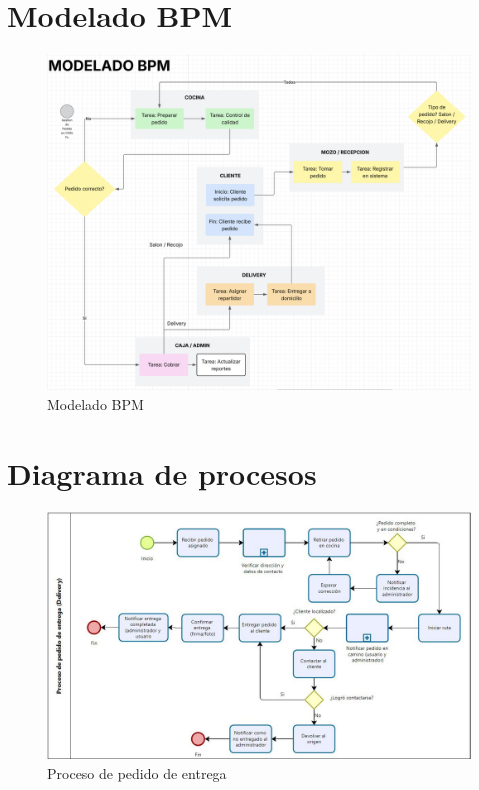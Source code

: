 \documentclass{article}
\begin{document}
\begin{doublespace}
    \section{Modelado BPM}
    \begin{itemize}
        \begin{figure}[H]
            \centering
            \vspace*{1cm}
            \includegraphics[width=14cm]{Gantt, WBS, Project Charter, BPM/MODELADO BPM.png}
            \caption{Modelado BPM}
            \label{fig:Modelado-BPM}
        \end{figure}
    \end{itemize}

    \section{Diagrama de procesos}
    \begin{itemize}
        \begin{figure}[H]
            \centering
            \vspace*{1cm}
            \includegraphics[width=14cm]{Diagrama de Procesos/Proceso de pedido de entrega.jpg}
            \caption{Proceso de pedido de entrega}
            \label{fig:proceso-pedido-de-entrega}
        \end{figure}


\end{itemize}
\end{doublespace}
\end{document}
